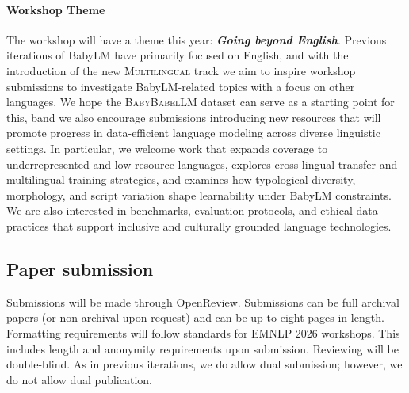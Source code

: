 \documentclass[11pt]{article}
\newcommand{\multilingual}[1]{\textsc{Multilingual}}
\begin{document}
\paragraph{Workshop Theme}
The workshop will have a theme this year: \textit{\textbf{Going beyond English}}.
Previous iterations of BabyLM have primarily focused on English, and with the introduction of the new \multilingual{} track we aim to inspire workshop submissions to investigate BabyLM-related topics with a focus on other languages.
We hope the \textsc{BabyBabelLM} dataset can serve as a starting point for this, band we also encourage submissions introducing new resources that will promote progress in data-efficient language modeling across diverse linguistic settings.
In particular, we welcome work that expands coverage to underrepresented and low-resource languages, explores cross-lingual transfer and multilingual training strategies, and examines how typological diversity, morphology, and script variation shape learnability under BabyLM constraints.
We are also interested in benchmarks, evaluation protocols, and ethical data practices that support inclusive and culturally grounded language technologies.


\subsection{Paper submission} Submissions will be made through OpenReview. Submissions can be full archival papers (or non-archival upon request) and can be up to eight pages in length. Formatting requirements will follow standards for EMNLP 2026 workshops. This includes length and anonymity requirements upon submission. Reviewing will be double-blind. As in previous iterations, we do allow dual submission; however, we do not allow dual publication.


\end{document}
